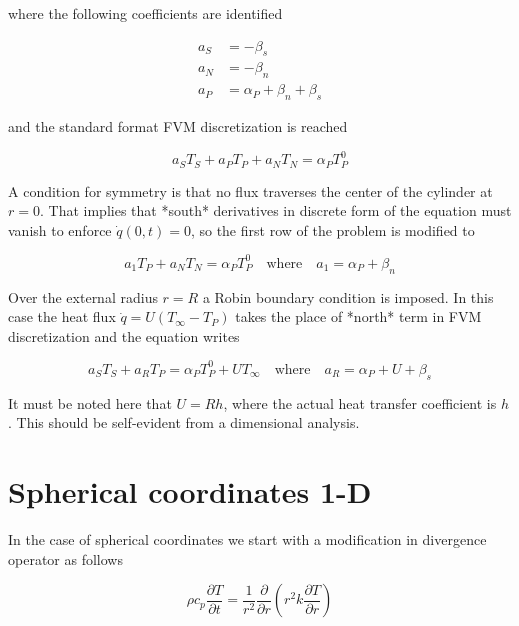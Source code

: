 \documentclass[oneside]{textbook}
\begin{document}
where the following coefficients are identified

\begin{equation}
\begin{aligned}
	a_{S} & = -\beta_{s}\\[8pt]
	a_{N} & = -\beta_{n}\\[8pt]
	a_{P} & = \alpha_{P}+\beta_{n}+\beta_{s}
\end{aligned}
\end{equation}

and the standard format FVM discretization is reached

\begin{equation}
a_ST_S + a_PT_P + a_NT_N = \alpha_{P}T_P^{0}
\end{equation}

A condition for symmetry is that no flux traverses the center of the cylinder at $r=0$. That implies that *south* derivatives in discrete form of the equation must vanish to enforce $\dot{q}(0,t)=0$, so the first row of the problem is modified to

\begin{equation}
a_1T_P + a_NT_N = \alpha_{P}T_P^{0}\quad\text{where}\quad{}a_1=\alpha_{P}+\beta_{n}
\end{equation}

Over the external radius $r=R$ a Robin boundary condition is imposed. In this case the heat flux $\dot{q}=U(T_\infty-T_P)$ takes the place of *north* term in FVM discretization and the equation writes

\begin{equation}
a_ST_S + a_RT_P = \alpha_{P}T_P^{0}+UT_\infty\quad\text{where}\quad{}a_R=\alpha_{P}+U+\beta_{s}
\end{equation}

It must be noted here that $U=Rh$, where the actual heat transfer coefficient is $h$. This should be self-evident from a dimensional analysis.

\section{Spherical coordinates 1-D}

In the case of spherical coordinates we start with a modification in divergence operator as follows

\begin{equation}
\rho{}c_{p}\frac{\partial{}T}{\partial{}t}=
\frac{1}{r^2}\frac{\partial}{\partial{}r}
\left(r^2k\frac{\partial{}T}{\partial{}r}\right)
\end{equation}
\end{document}
